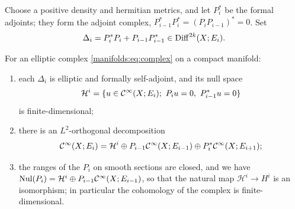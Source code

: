 Choose a positive density and hermitian metrics, and let $P_i^*$ be the formal
adjoints; they form the adjoint complex, $P_{i-1}^*P_i^*=(P_iP_{i-1})^*=0$. Set
\begin{equation*}
\Delta_i=P_i^*P_i+P_{i-1}P_{i-1}^*\in\operatorname{Diff}^{2k}(X;E_i).
\end{equation*}

\begin{theorem}[Hodge]\label{manifolds:thm:hodge}
For an elliptic complex \eqref{manifolds:eq:complex} on a compact manifold:
\begin{enumerate}[label=\textup{(\alph*)}]
\item each $\Delta_i$ is elliptic and formally self-adjoint, and its null space
\begin{equation*}
\mathcal H^i=\{u\in\CI(X;E_i);\ P_iu=0,\ P_{i-1}^*u=0\}
\end{equation*}
is finite-dimensional;
\item there is an $L^2$-orthogonal decomposition
\begin{equation}\label{manifolds:eq:hodge-decomposition}
\mathcal{C}^\infty(X;E_i)=\mathcal H^i\oplus P_{i-1}\mathcal{C}^\infty(X;E_{i-1})\oplus P_i^*\mathcal{C}^\infty(X;E_{i+1});
\end{equation}
\item the ranges of the $P_i$ on smooth sections are closed, and we have
$\operatorname{Nul}(P_i)=\mathcal H^i\oplus P_{i-1}\mathcal{C}^\infty(X;E_{i-1})$, so that the natural map
$\mathcal H^i\to H^i$ is an isomorphism; in particular the cohomology of the complex is
finite-dimensional.
\end{enumerate}
\end{theorem}
